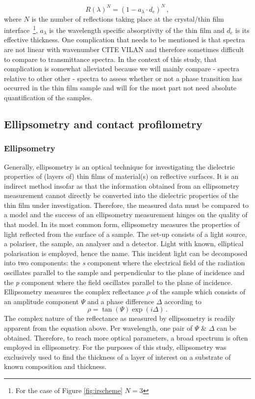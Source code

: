 \begin{equation}
\label{atr-reflectance}
	R(\lambda)^N = (1-a_{\lambda} \cdot d_e)^N \, ,
\end{equation}
where $N$ is the number of reflections taking place at the crystal/thin film interface~\footnote{For the case of Figure \ref{fig:irscheme} $N=3$}, $a_{\lambda}$ is the wavelength specific absorptivity of the thin film and $d_e$ is its effective thickness. One complication that needs to be mentioned is that \atr{} spectra are not linear with wavenumber CITE VILAN and therefore sometimes difficult to compare to transmittance spectra. In the context of this study, that complication is somewhat alleviated because we will mainly compare \atr{}-\ftir{} spectra relative to other other \atr{}-\ftir{} spectra to assess whether or not a phase transition has occurred in the thin film sample and will for the most part not need absolute quantification of the samples.
\subsection{Ellipsometry and contact profilometry}
\subsubsection{Ellipsometry}
Generally, ellipsometry is an optical technique for investigating the dielectric properties of (layers of) thin films of material(s) on reflective surfaces. It is an indirect method insofar as that the information obtained from an ellipsometry measurement cannot directly be converted into the dielectric properties of the thin film under investigation. Therefore, the measured data must be compared to a model and the success of an ellipsometry measurement hinges on the quality of that model. In its most common form, ellipsometry measures the properties of light reflected from the surface of a sample. The set-up consists of a light source, a polariser, the sample, an analyser and a detector. Light with known, elliptical polarisation is employed, hence the name. This incident light can be decomposed into two components: the \emph{s} component where the electrical field of the radiation oscillates parallel to the sample and perpendicular to the plane of incidence and the \emph{p} component where the field oscillates parallel to the plane of incidence. Ellipsometry measures the complex reflectance $\rho$ of the sample which consists of an amplitude component $\Psi$ and a phase difference $\Delta$ according to
\begin{equation}
	\rho = \tan \left( \Psi \right) \exp \left( i \Delta \right) \, .
\end{equation}
The complex nature of the reflectance as measured by ellipsometry is readily apparent from the equation above. Per wavelength, one pair of $\Psi$ \& $\Delta$ can be obtained. Therefore, to reach more optical parameters, a broad spectrum is often employed in ellipsometry. For the purposes of this study, ellipsometry was exclusively used to find the thickness of a layer of interest on a substrate of known composition and thickness.
